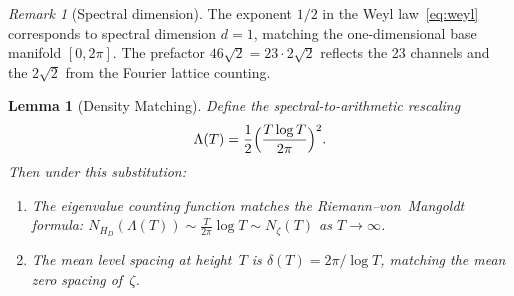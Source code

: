 \documentclass[11pt,a4paper]{article}
\theoremstyle{plain}
\newtheorem{lemma}[theorem]{Lemma}
\theoremstyle{remark}
\newtheorem{remark}[theorem]{Remark}
\begin{document}
\begin{remark}[Spectral dimension]
The exponent $1/2$ in the Weyl law~\eqref{eq:weyl} corresponds to
spectral dimension $d=1$, matching the one-dimensional base manifold
$[0,2\pi]$.  The prefactor $46\sqrt{2}=23\cdot 2\sqrt{2}$ reflects the
23 channels and the $2\sqrt{2}$ from the Fourier lattice counting.
\end{remark}

%
%

\begin{lemma}[Density Matching]\label{lem:density-matching}
Define the spectral-to-arithmetic rescaling
\begin{equation}\label{eq:rescaling}
  \Lambda(T)=\frac{1}{2}\Bigl(\frac{T\log T}{2\pi}\Bigr)^2.
\end{equation}
Then under this substitution:
\begin{enumerate}[nosep,label=(\roman*)]
  \item The eigenvalue counting function matches the Riemann--von~Mangoldt
        formula:
        $N_{H_D}(\Lambda(T))\sim\frac{T}{2\pi}\log T\sim N_\zeta(T)$
        as $T\to\infty$.
  \item The mean level spacing at height~$T$ is
        $\delta(T)=2\pi/\log T$, matching the mean zero spacing of~$\zeta$.
\end{enumerate}
\end{lemma}
\end{document}
